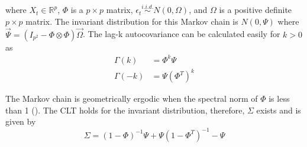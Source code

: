\documentclass[11pt]{article}
\theoremstyle{remark}
\begin{document}
where $X_t \in \mathbb{R}^p$, $\Phi $ is a $p \times p $ matrix, $ \epsilon_t \overset{i.i.d.}{\sim} N(0, \Omega)$, and $\Omega$ is a positive definite $p \times p$ matrix. The invariant distribution for this Markov chain is $N(0, \Psi)$ where $\Vec{\Psi} = (I_{p^2} - \Phi \otimes \Phi)\Vec{\Omega}$. The lag-k autocovariance can be calculated easily for $k >0$ as
%
\begin{align*}
    \Gamma(k) &= \Phi^k\Psi\\
    \Gamma(-k) &= \Psi(\Phi^T)^k
\end{align*}

The Markov chain is geometrically ergodic when the spectral norm of $\Phi$ is less than 1 (\cite{10.2307/1427459}). The CLT holds for the invariant distribution, therefore, $\Sigma$ exists and is given by
%
\[
\Sigma = (1 - \Phi)^{-1}\Psi + \Psi(1 - \Phi^T)^{-1} - \Psi
\]
\end{document}
